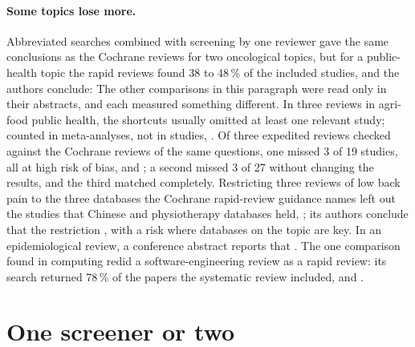 \paragraph{Some topics lose more.}
Abbreviated searches combined with screening by one reviewer gave the
same conclusions as the Cochrane reviews for two oncological topics, but
for a public-health topic the rapid reviews found 38 to 48\,\% of the
included studies, and the authors conclude:
The other comparisons in this paragraph were read only in their
abstracts, and each measured something different.
In three reviews in agri-food public health, the shortcuts usually
omitted at least one relevant study; counted in meta-analyses, not in
studies, .
Of three expedited reviews checked against the Cochrane reviews of the
same questions, one missed 3 of 19 studies, all at high risk of bias, and
;
a second missed 3 of 27 without changing the results, and the third
matched completely.
Restricting three reviews of low back pain to the three databases the
Cochrane rapid-review guidance names left out the studies that Chinese and
physiotherapy databases held, ; its authors conclude that
the restriction , with a risk where databases on the topic
are key.
In an epidemiological review, a conference abstract reports that
.
The one comparison found in computing redid a software-engineering
review as a rapid review: its search returned 78\,\% of the papers the
systematic review included, and .

\section{One screener or two}
\label{sec:abbreviated-single}

